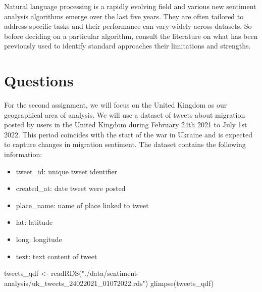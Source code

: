 \documentclass[
  letterpaper,
  DIV=11,
  numbers=noendperiod]{scrreprt}
\newenvironment{Shaded}{\begin{snugshade}}{\end{snugshade}}
\newcommand{\FunctionTok}[1]{\textcolor[rgb]{0.28,0.35,0.67}{#1}}
\newcommand{\NormalTok}[1]{\textcolor[rgb]{0.00,0.23,0.31}{#1}}
\newcommand{\OtherTok}[1]{\textcolor[rgb]{0.00,0.23,0.31}{#1}}
\newcommand{\StringTok}[1]{\textcolor[rgb]{0.13,0.47,0.30}{#1}}
\begin{document}
\begin{tcolorbox}[enhanced jigsaw, arc=.35mm, opacityback=0, leftrule=.75mm, bottomrule=.15mm, titlerule=0mm, opacitybacktitle=0.6, left=2mm, colframe=quarto-callout-note-color-frame, rightrule=.15mm, colback=white, bottomtitle=1mm, toprule=.15mm, breakable, title=\textcolor{quarto-callout-note-color}{\faInfo}\hspace{0.5em}{Note}, toptitle=1mm, coltitle=black, colbacktitle=quarto-callout-note-color!10!white]

Natural language processing is a rapidly evolving field and various new
sentiment analysis algorithms emerge over the last five years. They are
often tailored to address specific tasks and their performance can vary
widely across datasets. So before deciding on a particular algorithm,
consult the literature on what has been previously used to identify
standard approaches their limitations and strengths.

\end{tcolorbox}

\hypertarget{questions-3}{%
\section{Questions}\label{questions-3}}

For the second assignment, we will focus on the United Kingdom as our
geographical area of analysis. We will use a dataset of tweets about
migration posted by users in the United Kingdom during February 24th
2021 to July 1st 2022. This period coincides with the start of the war
in Ukraine and is expected to capture changes in migration sentiment.
The dataset contains the following information:

\begin{itemize}
\item
  tweet\_id: unique tweet identifier
\item
  created\_at: date tweet were posted
\item
  place\_name: name of place linked to tweet
\item
  lat: latitude
\item
  long: longitude
\item
  text: text content of tweet
\end{itemize}

\begin{Shaded}
\begin{Highlighting}[]
\NormalTok{tweets\_qdf }\OtherTok{\textless{}{-}} \FunctionTok{readRDS}\NormalTok{(}\StringTok{"./data/sentiment{-}analysis/uk\_tweets\_24022021\_01072022.rds"}\NormalTok{)}
\FunctionTok{glimpse}\NormalTok{(tweets\_qdf)}
\end{Highlighting}
\end{Shaded}
\end{document}

